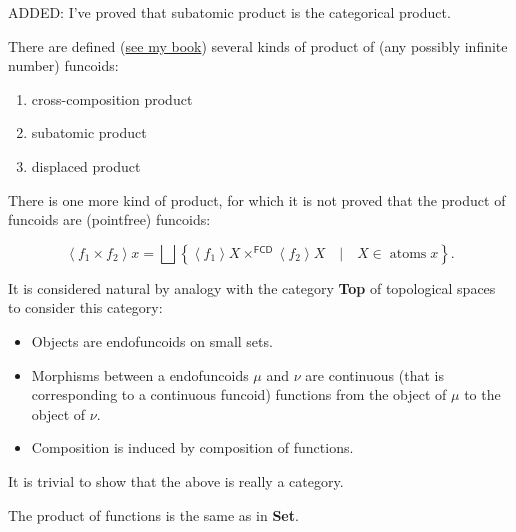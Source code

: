 \documentclass[12pt]{article}
\begin{document}
ADDED: I've proved that subatomic product is the categorical product.

There are defined (\href{http://www.mathematics21.org/algebraic-general-topology.html}{see my book}) several kinds of product of (any possibly infinite number) funcoids:

\begin{enumerate}
\item cross-composition product
\item subatomic product
\item displaced product
\end{enumerate}

There is one more kind of product, for which it is not proved that the product of funcoids are (pointfree) funcoids:

$$\left\langle f_1 \times f_2 \right\rangle x = \bigsqcup \left\{ \left\langle
f_1 \right\rangle X \times^{\mathsf{\operatorname{FCD}}} \left\langle f_2
\right\rangle X \hspace{1em} | \hspace{1em} X \in \operatorname{atoms} x \right\}.$$

It is considered natural by analogy with the category {\bf Top} of topological spaces to consider this category:

\begin{itemize}
\item Objects are endofuncoids on small sets.
\item Morphisms between a endofuncoids $\mu$ and $\nu$ are continuous (that is corresponding to a continuous funcoid) functions from the object of $\mu$ to the object of $\nu$.
\item Composition is induced by composition of functions.
\end{itemize}

It is trivial to show that the above is really a category.

The product of functions is the same as in {\bf Set}.
\end{document}
